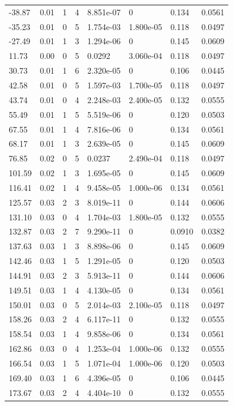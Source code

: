\documentclass[preview]{standalone}
\begin{document}
{{\begin{tabular}{L{1.2cm}C{1.2cm} C{0.3cm}C{0.5cm} C{1.4cm}C{1.4cm} C{1.4cm}C{1.4cm}}
  -38.87  &  0.01  & 1     &  4 &  8.851e-07  & 0  & 0.134 &  0.0561   \\ 
  -35.23  &  0.01  & 0     &  5 &  1.754e-03  & 1.800e-05  & 0.118 &  0.0497   \\ 
  -27.49  &  0.01  & 1     &  3 &  1.294e-06  & 0  & 0.145 &  0.0609   \\ 
  11.73  &  0.00  & 0     &  5 &  0.0292  & 3.060e-04  & 0.118 &  0.0497   \\ 
  30.73  &  0.01  & 1     &  6 &  2.320e-05  & 0  & 0.106 &  0.0445   \\ 
  42.58  &  0.01  & 0     &  5 &  1.597e-03  & 1.700e-05  & 0.118 &  0.0497   \\ 
  43.74  &  0.01  & 0     &  4 &  2.248e-03  & 2.400e-05  & 0.132 &  0.0555   \\ 
  55.49  &  0.01  & 1     &  5 &  5.519e-06  & 0  & 0.120 &  0.0503   \\ 
  67.55  &  0.01  & 1     &  4 &  7.816e-06  & 0  & 0.134 &  0.0561   \\ 
  68.17  &  0.01  & 1     &  3 &  2.639e-05  & 0  & 0.145 &  0.0609   \\ 
  76.85  &  0.02  & 0     &  5 &  0.0237  & 2.490e-04  & 0.118 &  0.0497   \\ 
  101.59  &  0.02  & 1     &  3 &  1.695e-05  & 0  & 0.145 &  0.0609   \\ 
  116.41  &  0.02  & 1     &  4 &  9.458e-05  & 1.000e-06  & 0.134 &  0.0561   \\ 
  125.57  &  0.03  & 2     &  3 &  8.019e-11  & 0  & 0.144 &  0.0606   \\ 
  131.10  &  0.03  & 0     &  4 &  1.704e-03  & 1.800e-05  & 0.132 &  0.0555   \\ 
  132.87  &  0.03  & 2     &  7 &  9.290e-11  & 0  & 0.0910 &  0.0382   \\ 
  137.63  &  0.03  & 1     &  3 &  8.898e-06  & 0  & 0.145 &  0.0609   \\ 
  142.46  &  0.03  & 1     &  5 &  1.291e-05  & 0  & 0.120 &  0.0503   \\ 
  144.91  &  0.03  & 2     &  3 &  5.913e-11  & 0  & 0.144 &  0.0606   \\ 
  149.51  &  0.03  & 1     &  4 &  4.130e-05  & 0  & 0.134 &  0.0561   \\ 
  150.01  &  0.03  & 0     &  5 &  2.014e-03  & 2.100e-05  & 0.118 &  0.0497   \\ 
  158.26  &  0.03  & 2     &  4 &  6.117e-11  & 0  & 0.132 &  0.0555   \\ 
  158.54  &  0.03  & 1     &  4 &  9.858e-06  & 0  & 0.134 &  0.0561   \\ 
  162.86  &  0.03  & 0     &  4 &  1.253e-04  & 1.000e-06  & 0.132 &  0.0555   \\ 
  166.54  &  0.03  & 1     &  5 &  1.071e-04  & 1.000e-06  & 0.120 &  0.0503   \\ 
  169.40  &  0.03  & 1     &  6 &  4.396e-05  & 0  & 0.106 &  0.0445   \\ 
  173.67  &  0.03  & 2     &  4 &  4.404e-10  & 0  & 0.132 &  0.0555   \\ 
\hline 
\end{tabular} 

}}
\end{document}
